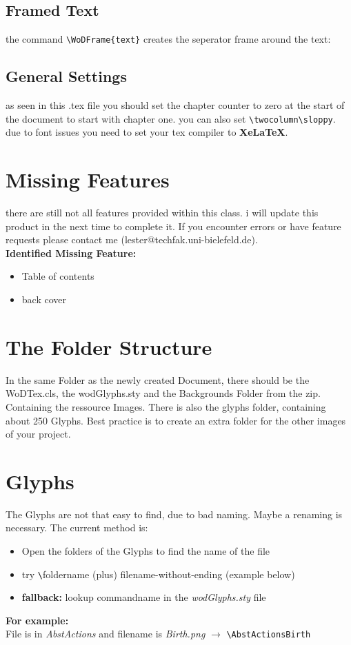 \documentclass[english,LQ,Werewolf]{WoDTeX}
\begin{document}
\subsection*{Framed Text}
the command \verb|\WoDFrame{text}| creates the seperator frame around the text:\\
\WoDFrame{\blindtext}
\subsection*{General Settings}
as seen in this .tex file you should set the chapter counter to zero at the start of the document to start with chapter one. you can also set \verb|\twocolumn\sloppy|. due to font issues you need to set your tex compiler to \textbf{XeLaTeX}.
\section*{Missing Features}
there are still not all features provided within this class. i will update this product in the next time to complete it. If you encounter errors or have feature requests please contact me (lester@techfak.uni-bielefeld.de).\\
\textbf{Identified Missing Feature:}
\begin{itemize}
\item Table of contents
\item back cover
\end{itemize}
\section*{The Folder Structure}
In the same Folder as the newly created Document, there should be the WoDTex.cls, the wodGlyphs.sty and the Backgrounds Folder from the zip. Containing the ressource Images. There is also the glyphs folder, containing about 250 Glyphs. Best practice is to create an extra folder for the other images of your project.
\section*{Glyphs}
The Glyphs are not that easy to find, due to bad naming. Maybe a renaming is necessary. The current method is:
\begin{itemize}
\item Open the folders of the Glyphs to find the name of the file
\item try \verb|\|foldername (plus) filename-without-ending (example below)
\item \textbf{fallback:} lookup commandname in the \textit{wodGlyphs.sty} file
\end{itemize}
\textbf{For example:}\\
File is in \textit{AbstActions} and filename is \textit{Birth.png} $\rightarrow$ \verb|\AbstActionsBirth|
\end{document}
